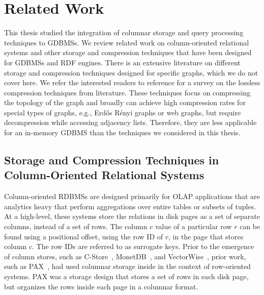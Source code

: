 \chapter{Related Work}
\label{c:related-works}

This thesis studied the integration of columnar storage and query processing techniques to GDBMSs. We review related work on column-oriented relational systems and other storage and compression techniques that have been designed for GDBMSs and RDF engines. There is an extensive literature on different storage and compression techniques designed for specific graphs, which we do not cover here. We refer the interested readers to reference \cite{sahu:survey, besta2018survey} for a survey on the lossless compression techniques from literature. These techniques focus on compressing the topology of the graph and broadly can achieve high compression rates for special types of graphs, e.g., Erd\H{o}s R\'enyi graphs or web graphs, but require decompression while accessing adjacency lists. Therefore, they are less applicable for an in-memory GDBMS than the techniques we considered in this thesis.


\section{Storage and Compression Techniques in Column-Oriented Relational Systems}
\label{sec:column-stores-overview}

Column-oriented RDBMSs are designed primarily for OLAP applications that are analytics heavy that perform aggregations over entire tables or subsets of tuples. At a high-level, these systems store the relations in disk pages as a set of separate columns, instead of a set of rows. The column $c$ value of a particular row $r$ can be found using a positional offset, using the row ID of $r$, in the page that stores column $c$. The row IDs are referred to as surrogate keys. Prior to the emergence of column stores, such as C-Store~\cite{c-store}, MonetDB~\cite{monet-2decades}, and VectorWise~\cite{boncz-vectorwise, boncz-vectorwise1},  prior work, such as PAX~\cite{pax}, had used columnar storage inside in the context of row-oriented systems. PAX was a storage design that stores a set of rows in each disk page, but organizes the rows inside each page in a columnar format. 

